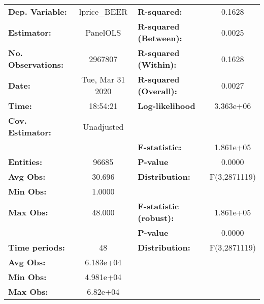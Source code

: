 \documentclass{report}
\begin{document}
\begin{center}
\begin{tabular}{lclc}
\toprule
\textbf{Dep. Variable:}       &    lprice\_BEER    & \textbf{  R-squared:         }   &      0.1628      \\
\textbf{Estimator:}           &      PanelOLS      & \textbf{  R-squared (Between):}  &      0.0025      \\
\textbf{No. Observations:}    &      2967807       & \textbf{  R-squared (Within):}   &      0.1628      \\
\textbf{Date:}                &  Tue, Mar 31 2020  & \textbf{  R-squared (Overall):}  &      0.0027      \\
\textbf{Time:}                &      18:54:21      & \textbf{  Log-likelihood     }   &    3.363e+06     \\
\textbf{Cov. Estimator:}      &     Unadjusted     & \textbf{                     }   &                  \\
\textbf{}                     &                    & \textbf{  F-statistic:       }   &    1.861e+05     \\
\textbf{Entities:}            &       96685        & \textbf{  P-value            }   &      0.0000      \\
\textbf{Avg Obs:}             &       30.696       & \textbf{  Distribution:      }   &   F(3,2871119)   \\
\textbf{Min Obs:}             &       1.0000       & \textbf{                     }   &                  \\
\textbf{Max Obs:}             &       48.000       & \textbf{  F-statistic (robust):} &    1.861e+05     \\
\textbf{}                     &                    & \textbf{  P-value            }   &      0.0000      \\
\textbf{Time periods:}        &         48         & \textbf{  Distribution:      }   &   F(3,2871119)   \\
\textbf{Avg Obs:}             &     6.183e+04      & \textbf{                     }   &                  \\
\textbf{Min Obs:}             &     4.981e+04      & \textbf{                     }   &                  \\
\textbf{Max Obs:}             &      6.82e+04      & \textbf{                     }   &                  \\
\bottomrule
\end{tabular}
\begin{tabular}{lcccccc}

\end{tabular}
\end{center}
\end{document}
